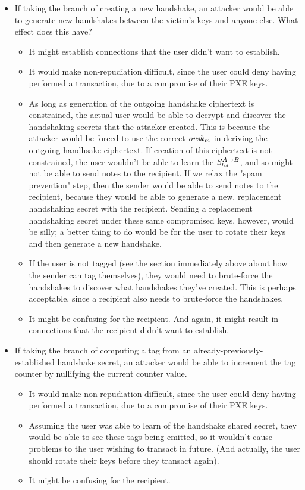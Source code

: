 \begin{itemize}
    \item If taking the branch of creating a new handshake, an attacker would be able to generate new handshakes between the victim's keys and anyone else. What effect does this have?
    \begin{itemize}
        \item It might establish connections that the user didn't want to establish.
        \item It would make non-repudiation difficult, since the user could deny having performed a transaction, due to a compromise of their PXE keys.
        \item As long as generation of the outgoing handshake ciphertext is constrained, the actual user would be able to decrypt and discover the handshaking secrets that the attacker created. This is because the attacker would be forced to use the correct $\ovskm$ in deriving the outgoing handhsake ciphertext. If creation of this ciphertext is not constrained, the user wouldn't be able to learn the $\sharedsecreths$, and so might not be able to send notes to the recipient. If we relax the "spam prevention" step, then the sender would be able to send notes to the recipient, because they would be able to generate a new, replacement handshaking secret with the recipient. Sending a replacement handshaking secret under these same compromised keys, however, would be silly; a better thing to do would be for the user to rotate their keys and then generate a new handshake.
        \item If the user is not tagged (see the section immediately above about how the sender can tag themselves), they would need to brute-force the handshakes to discover what handshakes they've created. This is perhaps acceptable, since a recipient also needs to brute-force the handshakes.
        \item It might be confusing for the recipient. And again, it might result in connections that the recipient didn't want to establish.
    \end{itemize}
    \item If taking the branch of computing a tag from an already-previously-established handshake secret, an attacker would be able to increment the tag counter by nullifying the current counter value. 
    \begin{itemize}
        \item It would make non-repudiation difficult, since the user could deny having performed a transaction, due to a compromise of their PXE keys.
        \item Assuming the user was able to learn of the handshake shared secret, they would be able to see these tags being emitted, so it wouldn't cause problems to the user wishing to transact in future. (And actually, the user should rotate their keys before they transact again).
        \item It might be confusing for the recipient.
    \end{itemize}
\end{itemize}
